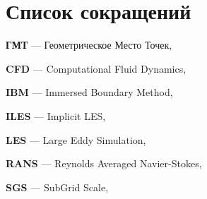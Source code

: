 \newpage

\section*{Список сокращений}

\textbf{ГМТ} --- Геометрическое Место Точек, \pageref{abbr:gmt}

\textbf{CFD} --- Computational Fluid Dynamics, \pageref{abbr:cfd}

\textbf{IBM} --- Immersed Boundary Method, \pageref{abbr:ibm}

\textbf{ILES} --- Implicit LES, \pageref{abbr:iles}

\textbf{LES} --- Large Eddy Simulation, \pageref{abbr:les}

\textbf{RANS} --- Reynolds Averaged Navier-Stokes, \pageref{abbr:rans}

\textbf{SGS} --- SubGrid Scale, \pageref{abbr:sgs}